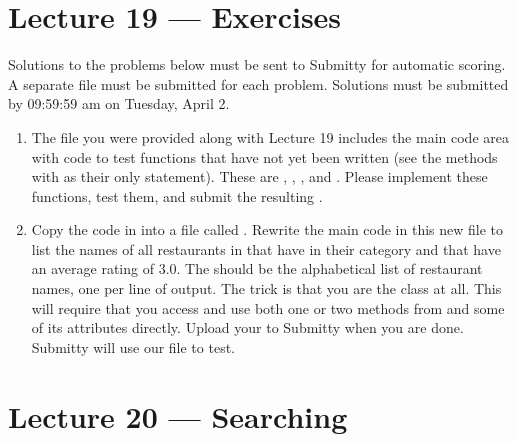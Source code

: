 \documentclass[letterpaper,10pt,english]{sphinxmanual}
\begin{document}
\chapter{Lecture 19 — Exercises}
\label{\detokenize{lecture_notes/lec19_classes2_exercises/exercises:lecture-19-exercises}}\label{\detokenize{lecture_notes/lec19_classes2_exercises/exercises::doc}}
Solutions to the problems below must be sent to Submitty for
automatic scoring.  A separate file must be submitted for each problem.
Solutions must be submitted by 09:59:59 am on Tuesday, April 2.
\begin{enumerate}
\def\theenumi{\arabic{enumi}}
\def\labelenumi{\theenumi .}
\makeatletter\def\p@enumii{\p@enumi \theenumi .}\makeatother
\item {} 
The  file you were provided along with Lecture 19
includes the main code
area with code to test functions that have not yet been written
(see the methods with  as their only statement). These
are , , , and
. Please implement these functions, test them, and
submit the resulting .

\item {} 
Copy the code in  into a file
called . Rewrite the main code in
this new file to list the names of all restaurants in
 that have  in their category and that have an average
rating of  3.0. The  should be the alphabetical
list of restaurant names, one per line of
output. The trick is that you are  the
 class at all. This will require that you
access and use both one or two methods from  and some
of its attributes directly. Upload your
 to Submitty when you are done.
Submitty will use our  file to test.

\end{enumerate}


\chapter{Lecture 20 — Searching}
\label{\detokenize{lecture_notes/lec20_searching:lecture-20-searching}}\label{\detokenize{lecture_notes/lec20_searching::doc}}
\end{document}
